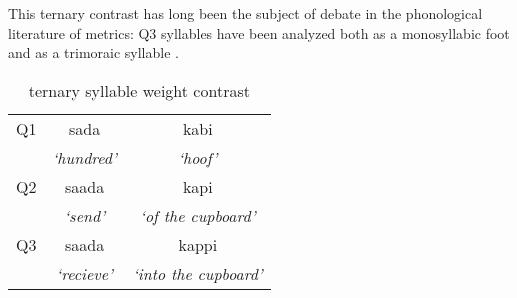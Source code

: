 This ternary contrast has long been the subject of debate in the phonological literature of metrics: Q3 syllables have been analyzed both as a monosyllabic foot \citep{princeMetricalTheoryEstonian1980} and as a trimoraic syllable \citep{hayesCompensatoryLengtheningMoraic1989, kuznetsovaEstonianWordProsody2018,prillopMoraeEstonianReply2020}. 


 \begin{table}[htb]
\centering
\begin{tabular}{lcc}
\hline

Q1 &		 sada 		& 	kabi  \\  
	&	 {\it `hundred'} 	&	 {\it`hoof' }\\
\hline
Q2 &		saada 		&	kapi \\
	&	 {\it`send' }		&	{\it`of the cupboard' }		\\
\hline
Q3 &		saada 	&	 kappi 	\\
	&	{\it`recieve' }	&	{\it`into the cupboard' }	\\
\hline
\end{tabular}
\label{qexamps}
\caption{ternary syllable weight contrast}
\end{table}
